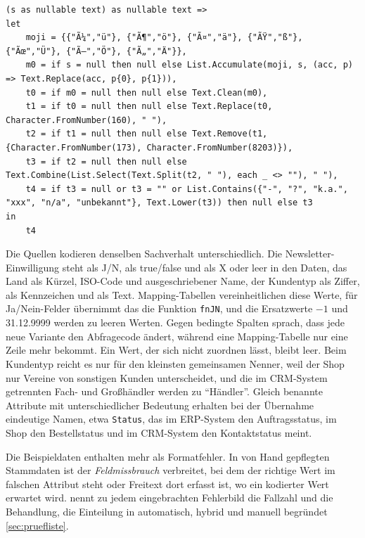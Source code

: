 \documentclass[a4paper,12pt]{article}
\newcommand{\pq}[1]{\texttt{#1}}        %
\begin{document}
\begin{lstlisting}[language=PowerQueryM, caption={Hilfsfunktion \pq{fnClean} gegen Zeichensatzfehler, unsichtbare Zeichen, Mehrfach-Leerzeichen und Platzhalter}, label={lst:fnclean}]
(s as nullable text) as nullable text =>
let
    moji = {{"Ã¼","ü"}, {"Ã¶","ö"}, {"Ã¤","ä"}, {"ÃŸ","ß"}, {"Ãœ","Ü"}, {"Ã–","Ö"}, {"Ã„","Ä"}},
    m0 = if s = null then null else List.Accumulate(moji, s, (acc, p) => Text.Replace(acc, p{0}, p{1})),
    t0 = if m0 = null then null else Text.Clean(m0),
    t1 = if t0 = null then null else Text.Replace(t0, Character.FromNumber(160), " "),
    t2 = if t1 = null then null else Text.Remove(t1, {Character.FromNumber(173), Character.FromNumber(8203)}),
    t3 = if t2 = null then null else Text.Combine(List.Select(Text.Split(t2, " "), each _ <> ""), " "),
    t4 = if t3 = null or t3 = "" or List.Contains({"-", "?", "k.a.", "xxx", "n/a", "unbekannt"}, Text.Lower(t3)) then null else t3
in
    t4
\end{lstlisting}

Die Quellen kodieren denselben Sachverhalt unterschiedlich. Die Newsletter-Einwilligung steht als J/N, als true/false und als X oder leer in den Daten, das Land als Kürzel, ISO-Code und ausgeschriebener Name, der Kundentyp als Ziffer, als Kennzeichen und als Text. Mapping-Tabellen vereinheitlichen diese Werte, für Ja/Nein-Felder übernimmt das die Funktion \pq{fnJN}, und die Ersatzwerte $-1$ und 31.12.9999 werden zu leeren Werten. Gegen bedingte Spalten sprach, dass jede neue Variante den Abfragecode ändert, während eine Mapping-Tabelle nur eine Zeile mehr bekommt. Ein Wert, der sich nicht zuordnen lässt, bleibt leer. Beim Kundentyp reicht es nur für den kleinsten gemeinsamen Nenner, weil der Shop nur Vereine von sonstigen Kunden unterscheidet, und die im CRM-System getrennten Fach- und Großhändler werden zu \enquote{Händler}. Gleich benannte Attribute mit unterschiedlicher Bedeutung erhalten bei der Übernahme eindeutige Namen, etwa \pq{Status}, das im ERP-System den Auftragsstatus, im Shop den Bestellstatus und im CRM-System den Kontaktstatus meint.

Die Beispieldaten enthalten mehr als Formatfehler. In von Hand gepflegten Stammdaten ist der \emph{Feldmissbrauch} verbreitet, bei dem der richtige Wert im falschen Attribut steht oder Freitext dort erfasst ist, wo ein kodierter Wert erwartet wird.  nennt zu jedem eingebrachten Fehlerbild die Fallzahl und die Behandlung, die Einteilung in automatisch, hybrid und manuell begründet \cref{sec:pruefliste}.
\end{document}

